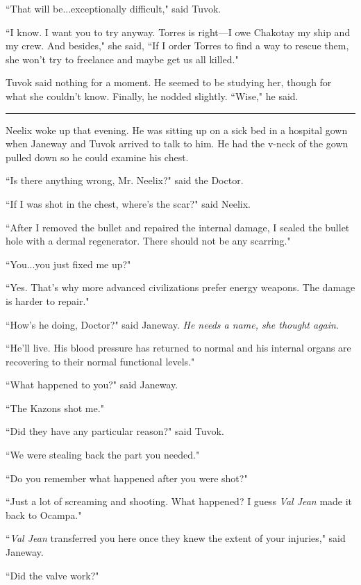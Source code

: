 \documentclass[twoside,letterpaper,12pt]{memoir}
\begin{document}
``That will be...exceptionally difficult," said Tuvok. 

``I know. I want you to try anyway. Torres is right---I owe Chakotay my ship and my crew. And besides," she said, ``If I order Torres to find a way to rescue them, she won't try to freelance and maybe get us all killed." 

Tuvok said nothing for a moment. He seemed to be studying her, though for what she couldn't know. Finally, he nodded slightly. ``Wise," he said. 

\begin{center}\rule{3cm}{0.4 pt}\end{center} 

Neelix woke up that evening. He was sitting up on a sick bed in a hospital gown when Janeway and Tuvok arrived to talk to him. He had the v-neck of the gown pulled down so he could examine his chest. 

``Is there anything wrong, Mr. Neelix?" said the Doctor. 

``If I was shot in the chest, where's the scar?" said Neelix. 

``After I removed the bullet and repaired the internal damage, I sealed the bullet hole with a dermal regenerator. There should not be any scarring." 

``You...you just fixed me up?" 

``Yes. That's why more advanced civilizations prefer energy weapons. The damage is harder to repair." 

``How's he doing, Doctor?" said Janeway. \textit{He needs a name, she thought again}. 

``He'll live. His blood pressure has returned to normal and his internal organs are recovering to their normal functional levels." 

``What happened to you?" said Janeway. 

``The Kazons shot me." 

``Did they have any particular reason?" said Tuvok. 

``We were stealing back the part you needed." 

``Do you remember what happened after you were shot?" 

``Just a lot of screaming and shooting. What happened? I guess \textit{Val Jean} made it back to Ocampa." 

``\textit{Val Jean} transferred you here once they knew the extent of your injuries," said Janeway. 

``Did the valve work?" 
\end{document}
